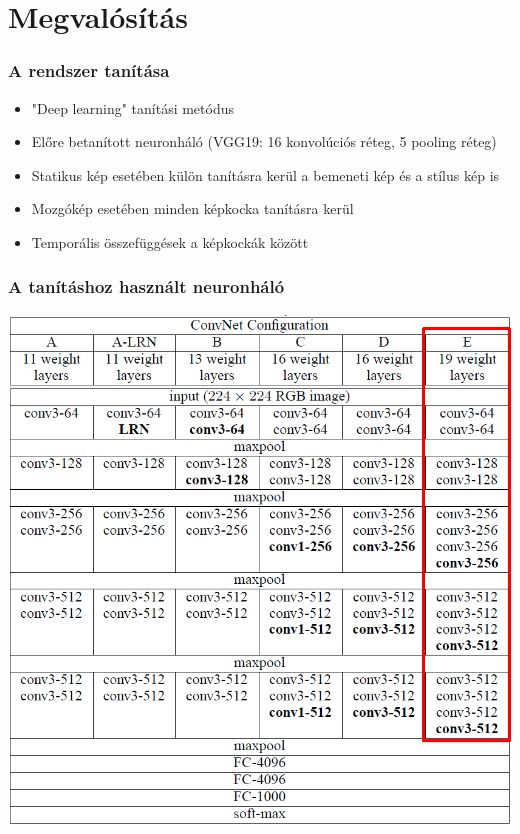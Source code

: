 \documentclass{beamer}
\begin{document}
	\section{Megvalósítás}
	
	\begin{frame}
		\frametitle{A rendszer tanítása}
		\begin{itemize}
			\item "Deep learning" tanítási metódus
			\item Előre betanított neuronháló (VGG19: 16 konvolúciós réteg, 5 pooling réteg)
			\item Statikus kép esetében külön tanításra kerül a bemeneti kép és a stílus kép is
			\item Mozgókép esetében minden képkocka tanításra kerül
			\item Temporális összefüggések a képkockák között
		\end{itemize}
	\end{frame}
	
	\begin{frame}
		\frametitle{A tanításhoz használt neuronháló}
		\begin{center}
			\includegraphics[scale=0.2]{VGG19.png}
		\end{center}
	\end{frame}
\end{document}
